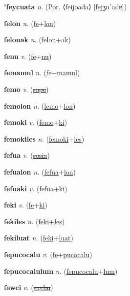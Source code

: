 \textbf{\hypertarget{'feycuata}{'feycuata}} \textit{n.} (Por. ⟨feijoada⟩ [fejʒuˈadɐ])


\textbf{\hypertarget{felon}{felon}} \textit{n.} (\hyperlink{fe}{fe}+\allowbreak \hyperlink{lon}{lon})


\textbf{\hypertarget{felonak}{felonak}} \textit{n.} (\hyperlink{felon}{felon}+\allowbreak \hyperlink{ak}{ak})


\textbf{\hypertarget{fenu}{fenu}} \textit{v.} (\hyperlink{fe}{fe}+\allowbreak \hyperlink{nu}{nu})


\textbf{\hypertarget{femamul}{femamul}} \textit{n.} (\hyperlink{fe}{fe}+\allowbreak \hyperlink{mamul}{mamul})


\textbf{\hypertarget{femo}{femo}} \textit{v.} (\hyperlink{sope}{\sout{sope}})


\textbf{\hypertarget{femolon}{femolon}} \textit{n.} (\hyperlink{femo}{femo}+\allowbreak \hyperlink{lon}{lon})


\textbf{\hypertarget{femoki}{femoki}} \textit{v.} (\hyperlink{femo}{femo}+\allowbreak \hyperlink{ki}{ki})


\textbf{\hypertarget{femokiles}{femokiles}} \textit{n.} (\hyperlink{femoki}{femoki}+\allowbreak \hyperlink{les}{les})


\textbf{\hypertarget{fefua}{fefua}} \textit{v.} (\hyperlink{sosia}{\sout{sosia}})


\textbf{\hypertarget{fefualon}{fefualon}} \textit{n.} (\hyperlink{fefua}{fefua}+\allowbreak \hyperlink{lon}{lon})


\textbf{\hypertarget{fefuaki}{fefuaki}} \textit{v.} (\hyperlink{fefua}{fefua}+\allowbreak \hyperlink{ki}{ki})


\textbf{\hypertarget{feki}{feki}} \textit{v.} (\hyperlink{fe}{fe}+\allowbreak \hyperlink{ki}{ki})


\textbf{\hypertarget{fekiles}{fekiles}} \textit{n.} (\hyperlink{feki}{feki}+\allowbreak \hyperlink{les}{les})


\textbf{\hypertarget{fekiluat}{fekiluat}} \textit{n.} (\hyperlink{feki}{feki}+\allowbreak \hyperlink{luat}{luat})


\textbf{\hypertarget{fepucocalu}{fepucocalu}} \textit{v.} (\hyperlink{fe}{fe}+\allowbreak \hyperlink{pucocalu}{pucocalu})


\textbf{\hypertarget{fepucocalulum}{fepucocalulum}} \textit{n.} (\hyperlink{fepucocalu}{fepucocalu}+\allowbreak \hyperlink{lum}{lum})


\textbf{\hypertarget{fawci}{fawci}} \textit{v.} (\hyperlink{sayhu}{\sout{sayhu}})



